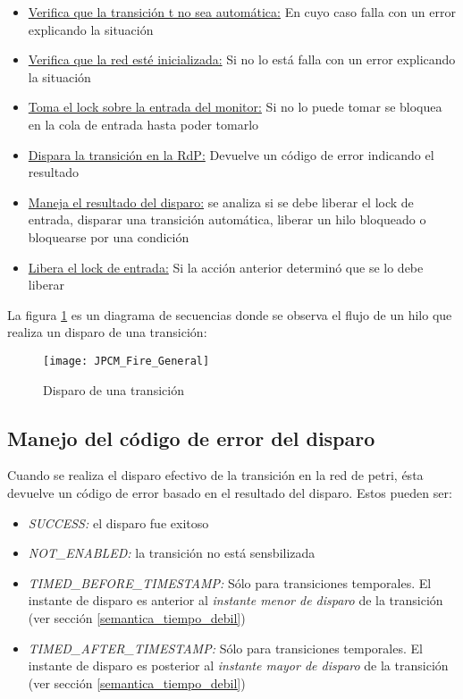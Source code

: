 \begin{itemize}
  \item \underline{Verifica que la transición t no sea automática:} En cuyo caso
  falla con un error explicando la situación
  \item \underline{Verifica que la red esté inicializada:} Si no lo está falla
  con un error explicando la situación
  \item \underline{Toma el lock sobre la entrada del monitor:} Si no lo puede
  tomar se bloquea en la cola de entrada hasta poder tomarlo
  \item \underline{Dispara la transición en la RdP:} Devuelve un código de error
  indicando el resultado
  \item \underline{Maneja el resultado del disparo:} se analiza si se debe
  liberar el lock de entrada, disparar una transición automática, liberar un
  hilo bloqueado o bloquearse por una condición
  \item \underline{Libera el lock de entrada:} Si la acción anterior determinó
  que se lo debe liberar
\end{itemize}
 
La figura \ref{fig:JPCM_Fire_General} es un diagrama de secuencias donde se
observa el flujo de un hilo que realiza un disparo de una transición:

\begin{figure}[H]
  \hspace*{-3cm}
  \texttt{[image: JPCM\_Fire\_General]}
  \caption{Disparo de una transición}
  \label{fig:JPCM_Fire_General}
\end{figure}

\subsection*{Manejo del código de error del disparo}

Cuando se realiza el disparo efectivo de la transición en la red de petri, ésta
devuelve un código de error basado en el resultado del disparo. Estos pueden
ser:
\begin{itemize}
  \item \textit{SUCCESS:} el disparo fue exitoso
  \item \textit{NOT\_ENABLED:} la transición no está sensbilizada
  \item \textit{TIMED\_BEFORE\_TIMESTAMP:} Sólo para transiciones
  temporales. El instante de disparo es anterior al \textit{instante menor de disparo} de la transición
  (ver sección \ref{semantica_tiempo_debil})
  \item \textit{TIMED\_AFTER\_TIMESTAMP:} Sólo para transiciones
  temporales. El instante de disparo es posterior al \textit{instante mayor de disparo} de la transición
  (ver sección \ref{semantica_tiempo_debil})
\end{itemize}

